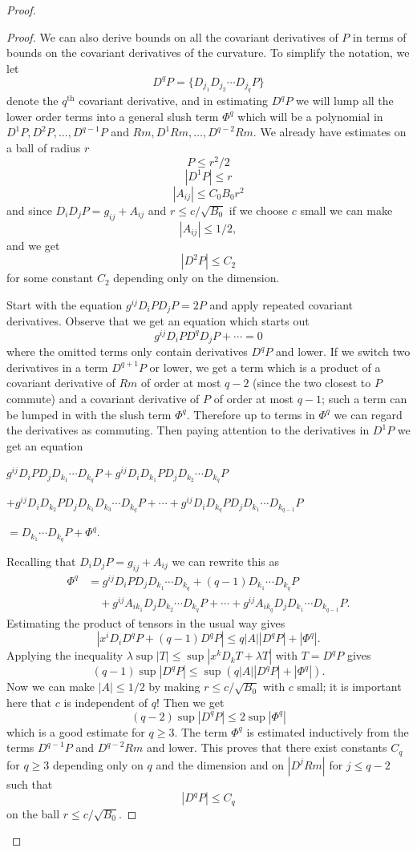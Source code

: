 \begin{proof}
\begin{proof}
\smallskip
We can also derive bounds on all the covariant derivatives of $P$
in terms of bounds on the covariant derivatives of the curvature.
To simplify the notation, we let
$$
D^qP= \{D_{j_1}D_{j_2} \cdots D_{j_q}P \}
$$
denote the $q^{\operatorname{th}}$ covariant derivative, and in
estimating $D^qP$ we will lump all the lower order terms into a
general slush term $\Phi^q$ which will be a polynomial in
$D^1P,D^2P, \ldots, D^{q-1}P$ and $Rm, D^1Rm, \ldots, D^{q-2}Rm$.
We already have estimates on a ball of radius $r$
$$
P \leq r^2/2
$$
$$
|D^1P|\leq r
$$
$$
|A_{ij}| \leq C_0 B_0r^2
$$
and since $D_iD_jP=g_{ij}+A_{ij}$ and $r \leq c /\sqrt{B_0}$ if we
choose $c$ small we can make
$$
|A_{ij}|\leq 1/2,
$$
and we get
$$
|D^2P| \leq C_2
$$
for some constant $C_2$ depending only on the dimension.

\smallskip
Start with the equation $g^{ij}D_iPD_jP=2P$ and apply repeated
covariant derivatives. Observe that we get an equation which
starts out
$$
g^{ij}D_iPD^qD_jP+ \cdots =0
$$
where the omitted terms only contain derivatives $D^qP$ and lower.
If we switch two derivatives in a term $D^{q+1}P$ or lower, we get
a term which is a product of a covariant derivative of $Rm$ of
order at most $q-2$ (since the two closest to $P$ commute) and a
covariant derivative of $P$ of order at most $q-1$; such a term
can be lumped in with the slush term $\Phi^q$. Therefore up to
terms in $\Phi^q$ we can regard the derivatives as commuting. Then
paying attention to the derivatives in $D^1P$ we get an equation

\smallskip\noindent
$g^{ij}D_iPD_jD_{k_1} \cdots D_{k_q}P+g^{ij}D_iD_{k_1}PD_jD_{k_2}
\cdots D_{k_q}P$

\smallskip\noindent
$+g^{ij}D_iD_{k_2}PD_jD_{k_1}D_{k_3} \cdots D_{k_q}P + \cdots +
g^{ij}D_iD_{k_q}PD_jD_{k_1} \cdots D_{k_{q-1}}P$

\smallskip\noindent
$ =D_{k_1} \cdots D_{k_q}P+ \Phi^q$.

\medskip
Recalling that $D_iD_jP=g_{ij}+A_{ij}$ we can rewrite this as
\begin{align*}
\Phi^q &  = g^{ij}D_iPD_jD_{k_1} \cdots D_{k_q}+(q-1)D_{k_1}
\cdots
D_{k_q}P \\
&\quad  + g^{ij}A_{ik_1}D_jD_{k_2} \cdots D_{k_q}P+ \cdots +
g^{ij}A_{ik_q}D_jD_{k_1} \cdots D_{k_{q-1}}P.
\end{align*}
Estimating the product of tensors in the usual way gives
$$
|x^iD_iD^qP+(q-1)D^qP| \leq q|A||D^qP|+|\Phi^q|.
$$
Applying the inequality $\lambda \sup|T| \leq \sup|x^kD_kT+
\lambda T|$ with $T=D^qP$ gives
$$
(q-1) \sup|D^qP| \leq\sup(q|A||D^qP|+| \Phi^q|).
$$
Now we can make $|A| \leq 1/2$ by making $r \leq c/ \sqrt{B_0}$
with $c$ small; it is important here that $c$ is independent of
$q!$ Then we get
$$
(q-2) \operatorname{sup}|D^qP| \leq 2 \operatorname{sup} | \Phi^q|
$$
which is a good estimate for $q \geq 3$. The term $\Phi^q$ is
estimated inductively from the terms $D^{q-1}P$ and $D^{q-2}Rm$
and lower. This proves that there exist constants $C_q$ for $q
\geq 3$ depending only on $q$ and the dimension and on $|D^jRm|$
for $j \leq q-2$ such that
$$
|D^qP| \leq C_q
$$
on the ball $r \leq c/ \sqrt{B_0}.$


\end{proof}
\end{proof}
